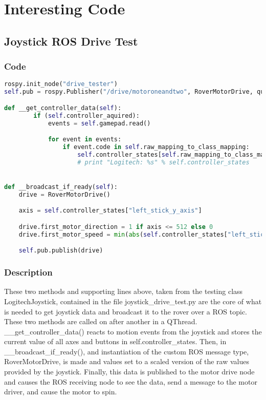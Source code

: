 
\section{Interesting Code}
\subsection{Joystick ROS Drive Test}
\subsubsection{Code}
\begin{lstlisting}[language=python]
rospy.init_node("drive_tester")
self.pub = rospy.Publisher("/drive/motoroneandtwo", RoverMotorDrive, queue_size=1)

def __get_controller_data(self):
        if (self.controller_aquired):
            events = self.gamepad.read()

            for event in events:
                if event.code in self.raw_mapping_to_class_mapping:
                    self.controller_states[self.raw_mapping_to_class_mapping[event.code]] = event.state
                    # print "Logitech: %s" % self.controller_states


def __broadcast_if_ready(self):
	drive = RoverMotorDrive()

	axis = self.controller_states["left_stick_y_axis"]

	drive.first_motor_direction = 1 if axis <= 512 else 0
	drive.first_motor_speed = min(abs(self.controller_states["left_stick_y_axis"] - 512) * 128, 65535)

	self.pub.publish(drive)
\end{lstlisting}

\subsubsection{Description}
These two methods and supporting lines above, taken from the testing class LogitechJoystick, contained in the file joystick\_drive\_test.py are the core of what is needed to get joystick data and broadcast it to the rover over a ROS topic.
These two methods are called on after another in a QThread. \_\_get\_controller\_data() reacts to motion events from the joystick and stores the current value of all axes and buttons in self.controller\_states. Then, in \_\_broadcast\_if\_ready(), and instantiation of the custom ROS message type, RoverMotorDrive, is made and values set to a scaled version of the raw values provided by the joystick. Finally, this data is published to the motor drive node and causes the ROS receiving node to see the data, send a message to the motor driver, and cause the motor to spin.

